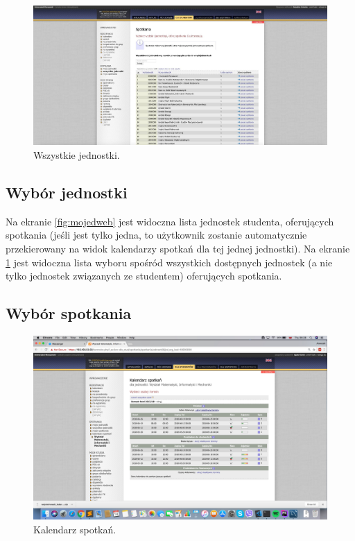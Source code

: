 \documentclass[licencjacka]{pracamgr}
\begin{document}
\begin{figure}[!]
  \includegraphics[width=\linewidth]{wszystkie_jednostki_usosweb.jpg}
  \caption{Wszystkie jednostki.}
  \label{fig:wszjweb}
\end{figure}

\subsection{Wybór jednostki}
Na ekranie \ref{fig:mojedweb} jest widoczna lista jednostek studenta, oferujących spotkania (jeśli jest tylko jedna, to użytkownik zostanie automatycznie przekierowany na widok kalendarzy spotkań dla tej jednej jednostki).
Na ekranie \ref{fig:wszjweb} jest widoczna lista wyboru spośród wszystkich dostępnych jednostek (a nie tylko jednostek związanych ze studentem) oferujących spotkania.

\subsection{Wybór spotkania}

\begin{figure}[!]
  \includegraphics[width=\linewidth]{kalendarzUSOSweb.jpg}
  \caption{Kalendarz spotkań.}
  \label{fig:kalweb}
\end{figure}
\end{document}
